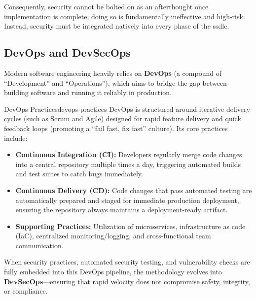 \noindent Consequently, security cannot be bolted on as an afterthought once implementation is complete; doing so is fundamentally ineffective and high-risk. Instead, security must be integrated natively into every phase of the \gls{ssdlc}.

\subsection{DevOps and DevSecOps}
Modern software engineering heavily relies on \textbf{DevOps} (a compound of ``Development'' and ``Operations''), which aims to bridge the gap between building software and running it reliably in production.

\begin{concept}{DevOps Practices}{devops-practices}
    DevOps is structured around iterative delivery cycles (such as Scrum and Agile) designed for rapid feature delivery and quick feedback loops (promoting a ``fail fast, fix fast'' culture). Its core practices include:
    \begin{itemize}
        \item \textbf{Continuous Integration (CI):} Developers regularly merge code changes into a central repository multiple times a day, triggering automated builds and test suites to catch bugs immediately.
        \item \textbf{Continuous Delivery (CD):} Code changes that pass automated testing are automatically prepared and staged for immediate production deployment, ensuring the repository always maintains a deployment-ready artifact.
        \item \textbf{Supporting Practices:} Utilization of microservices, infrastructure as code (IaC), centralized monitoring/logging, and cross-functional team communication.
    \end{itemize}
\end{concept}

\noindent When security practices, automated security testing, and vulnerability checks are fully embedded into this DevOps pipeline, the methodology evolves into \textbf{DevSecOps}—ensuring that rapid velocity does not compromise safety, integrity, or compliance.
